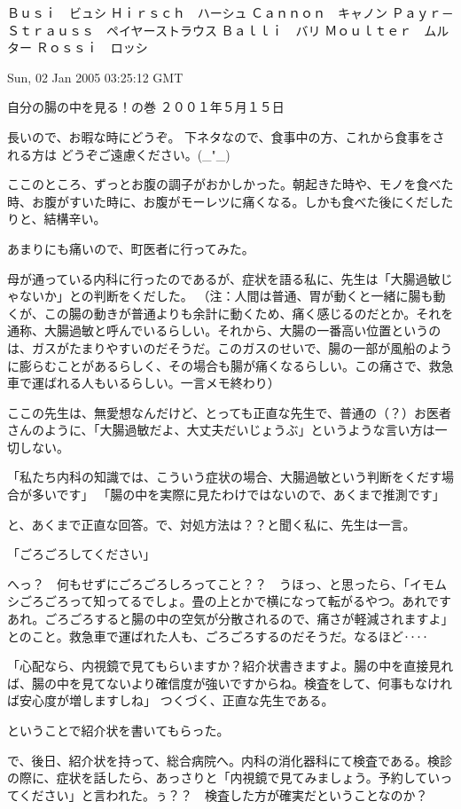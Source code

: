 Ｂｕｓｉ　ビュシ
Ｈｉｒｓｃｈ　ハーシュ
Ｃａｎｎｏｎ　キャノン
Ｐａｙｒ－Ｓｔｒａｕｓｓ　ペイヤーストラウス
Ｂａｌｌｉ　バリ
Ｍｏｕｌｔｅｒ　ムルター
Ｒｏｓｓｉ　ロッシ




Sun, 02 Jan 2005 03:25:12 GMT

自分の腸の中を見る！の巻
２００１年５月１５日

長いので、お暇な時にどうぞ。
下ネタなので、食事中の方、これから食事をされる方は
どうぞご遠慮ください。(_"_)

ここのところ、ずっとお腹の調子がおかしかった。朝起きた時や、モノを食べた時、お腹がすいた時に、お腹がモーレツに痛くなる。しかも食べた後にくだしたりと、結構辛い。

あまりにも痛いので、町医者に行ってみた。

母が通っている内科に行ったのであるが、症状を語る私に、先生は「大腸過敏じゃないか」との判断をくだした。
（注：人間は普通、胃が動くと一緒に腸も動くが、この腸の動きが普通よりも余計に動くため、痛く感じるのだとか。それを通称、大腸過敏と呼んでいるらしい。それから、大腸の一番高い位置というのは、ガスがたまりやすいのだそうだ。このガスのせいで、腸の一部が風船のように膨らむことがあるらしく、その場合も腸が痛くなるらしい。この痛さで、救急車で運ばれる人もいるらしい。一言メモ終わり）

ここの先生は、無愛想なんだけど、とっても正直な先生で、普通の（？）お医者さんのように、「大腸過敏だよ、大丈夫だいじょうぶ」というような言い方は一切しない。

「私たち内科の知識では、こういう症状の場合、大腸過敏という判断をくだす場合が多いです」
「腸の中を実際に見たわけではないので、あくまで推測です」

と、あくまで正直な回答。で、対処方法は？？と聞く私に、先生は一言。

「ごろごろしてください」

へっ？　何もせずにごろごろしろってこと？？　うほっ、と思ったら、「イモムシごろごろって知ってるでしょ。畳の上とかで横になって転がるやつ。あれですあれ。ごろごろすると腸の中の空気が分散されるので、痛さが軽減されますよ」とのこと。救急車で運ばれた人も、ごろごろするのだそうだ。なるほど‥‥

「心配なら、内視鏡で見てもらいますか？紹介状書きますよ。腸の中を直接見れば、腸の中を見てないより確信度が強いですからね。検査をして、何事もなければ安心度が増しますしね」
つくづく、正直な先生である。

ということで紹介状を書いてもらった。


で、後日、紹介状を持って、総合病院へ。内科の消化器科にて検査である。検診の際に、症状を話したら、あっさりと「内視鏡で見てみましょう。予約していってください」と言われた。ぅ？？　検査した方が確実だということなのか？

